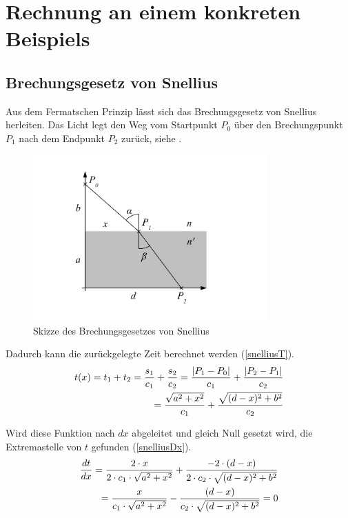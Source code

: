 \section{Rechnung an einem konkreten Beispiels}

\subsection{Brechungsgesetz von Snellius \label{brechungsgesetz}}
\cite{Wikipedia} Aus dem Fermatschen Prinzip lässt sich das Brechungsgesetz von Snellius herleiten.
Das Licht legt den Weg vom Startpunkt $P_0$ über den Brechungspunkt $P_1$ 
nach dem Endpunkt $P_2$ zurück, siehe .
\begin{figure}[H]
	\includegraphics[width=0.8\textwidth]{./picture/Brechung.pdf}
	\caption{Skizze des Brechungsgesetzes von Snellius}
	\label{Ab:brechung}
\end{figure}

Dadurch kann die zurückgelegte Zeit berechnet werden (\eqref{snelliusT}).
\begin{align}
t(x) = t_1 + t_2 = \frac{s_1}{c_1} + \frac{s_2}{c_2} = \frac{|P_1 - P_0|}{c_1} + \frac{|P_2 - P_1|}{c_2} \notag \\
= \frac{\sqrt{a^2 + x^2}}{c_1} + \frac{\sqrt{(d-x)^2 + b^2}}{c_2} \label{snelliusT}
\end{align}

Wird diese Funktion nach $dx$ abgeleitet und gleich Null gesetzt wird, die Extremastelle von $t$ gefunden (\eqref{snelliusDx}).
\begin{align}
	\frac{dt}{dx} = \frac{2 \cdot x}{2 \cdot c_1 \cdot \sqrt{a^2 + x^2}} + \frac{-2 \cdot (d-x)}{2 \cdot c_2 \cdot \sqrt{(d-x)^2 + b^2}} \notag \\
	= \frac{x}{c_1 \cdot \sqrt{a^2 + x^2}} - \frac{(d-x)}{c_2 \cdot \sqrt{(d-x)^2 + b^2}} = 0 
	\label{snelliusDx}
\end{align}

